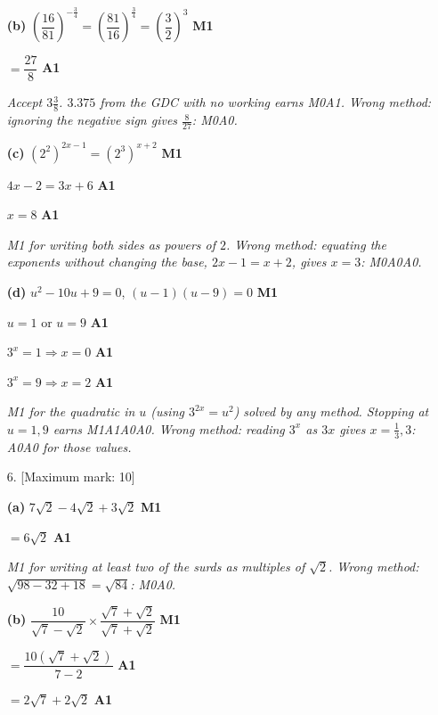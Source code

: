 \documentclass[12pt, twoside]{article}
\begin{document}
\begin{enumerate}[itemsep=0.3cm]
\textbf{(b)} $\left(\dfrac{16}{81}\right)^{-\frac{3}{4}} = \left(\dfrac{81}{16}\right)^{\frac{3}{4}} = \left(\dfrac{3}{2}\right)^{3}$ \hfill \textbf{M1}

$= \dfrac{27}{8}$ \hfill \textbf{A1}

\emph{Accept $3\frac{3}{8}$. $3.375$ from the GDC with no working earns
M0A1. Wrong method: ignoring the negative sign gives $\frac{8}{27}$:
M0A0.}

\textbf{(c)} $\left(2^{2}\right)^{2x - 1} = \left(2^{3}\right)^{x + 2}$ \hfill \textbf{M1}

$4x - 2 = 3x + 6$ \hfill \textbf{A1}

$x = 8$ \hfill \textbf{A1}

\emph{M1 for writing both sides as powers of $2$. Wrong method: equating
the exponents without changing the base, $2x - 1 = x + 2$, gives $x = 3$:
M0A0A0.}

\textbf{(d)} $u^{2} - 10u + 9 = 0$, \quad $(u - 1)(u - 9) = 0$ \hfill \textbf{M1}

$u = 1$ or $u = 9$ \hfill \textbf{A1}

$3^{x} = 1 \Rightarrow x = 0$ \hfill \textbf{A1}

$3^{x} = 9 \Rightarrow x = 2$ \hfill \textbf{A1}

\emph{M1 for the quadratic in $u$ (using $3^{2x} = u^{2}$) solved by any
method. Stopping at $u = 1, 9$ earns M1A1A0A0. Wrong method: reading $3^{x}$
as $3x$ gives $x = \frac{1}{3}, 3$: A0A0 for those values.}

\newpage

\item[6.] [Maximum mark: 10]

\textbf{(a)} $7\sqrt{2} - 4\sqrt{2} + 3\sqrt{2}$ \hfill \textbf{M1}

$= 6\sqrt{2}$ \hfill \textbf{A1}

\emph{M1 for writing at least two of the surds as multiples of $\sqrt{2}$.
Wrong method: $\sqrt{98 - 32 + 18} = \sqrt{84}$: M0A0.}

\textbf{(b)} $\dfrac{10}{\sqrt{7} - \sqrt{2}} \times \dfrac{\sqrt{7} + \sqrt{2}}{\sqrt{7} + \sqrt{2}}$ \hfill \textbf{M1}

$= \dfrac{10\left(\sqrt{7} + \sqrt{2}\right)}{7 - 2}$ \hfill \textbf{A1}

$= 2\sqrt{7} + 2\sqrt{2}$ \hfill \textbf{A1}


\end{enumerate}
\end{document}

